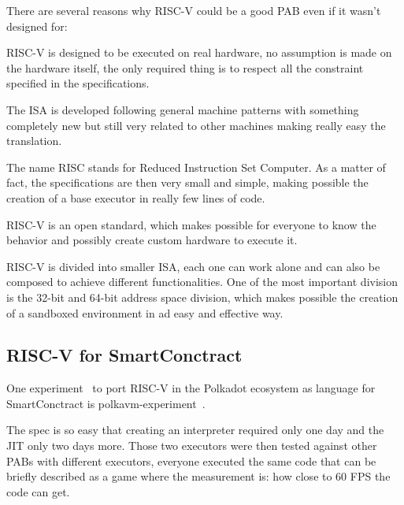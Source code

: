 There are several reasons why RISC-V could be a good PAB even if it wasn't designed for:
\begin{description}[style=nextline]
  \item[Real ISA suitable for direct native hardware implementation]
        RISC-V is designed to be executed on real hardware, no assumption is made on the hardware itself, the only required thing is to respect all the constraint specified in the specifications.


        The ISA is developed following general machine patterns with something completely new but still very related to other machines making really easy the translation.
  \item[RISC]
        The name RISC stands for Reduced Instruction Set Computer. As a matter of fact, the specifications are then very small and simple, making possible the creation of a base executor in really few lines of code.
  \item[Completely open ISA]
        RISC-V is an open standard, which makes possible for everyone to know the behavior and possibly create custom hardware to execute it.
  \item[ISA separated into a small base integer ISA]
        RISC-V is divided into smaller ISA, each one can work alone and can also be composed to achieve different functionalities. One of the most important division is the 32-bit and 64-bit address space division, which makes possible the creation of a sandboxed environment in ad easy and effective way.
\end{description}

\subsection{RISC-V for SmartConctract}

One experiment~\cite{polkavm-forum} to port RISC-V in the Polkadot ecosystem as language for SmartConctract is polkavm-experiment~\cite{polkavm-experiment}.

The spec is so easy that creating an interpreter required only one day and the JIT only two days more. Those two executors were then tested against other PABs with different executors, everyone executed the same code that can be briefly described as a game where the measurement is: how close to 60 FPS the code can get.

